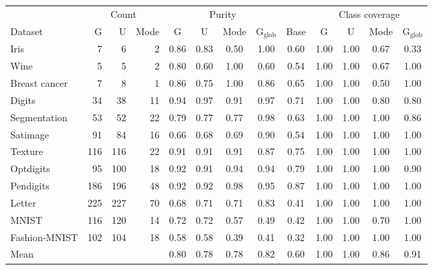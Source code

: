 \begin{tabular}{@{}lrrrccccccccc@{}}
\toprule
 & \multicolumn{3}{c}{Count} & \multicolumn{4}{c}{Purity} & & \multicolumn{4}{c}{Class coverage} \\
\cmidrule(lr){2-4}\cmidrule(lr){5-8}\cmidrule(lr){10-13}
Dataset & G & U & Mode & G & U & Mode & G$_{\mathrm{glob}}$ & Base & G & U & Mode & G$_{\mathrm{glob}}$ \\
\midrule
Iris & 7 & 6 & 2 & 0.86 & 0.83 & 0.50 & 1.00 & 0.60 & 1.00 & 1.00 & 0.67 & 0.33 \\
Wine & 5 & 5 & 2 & 0.80 & 0.60 & 1.00 & 0.60 & 0.54 & 1.00 & 1.00 & 0.67 & 1.00 \\
Breast cancer & 7 & 8 & 1 & 0.86 & 0.75 & 1.00 & 0.86 & 0.65 & 1.00 & 1.00 & 0.50 & 1.00 \\
Digits & 34 & 38 & 11 & 0.94 & 0.97 & 0.91 & 0.97 & 0.71 & 1.00 & 1.00 & 0.80 & 0.80 \\
Segmentation & 53 & 52 & 22 & 0.79 & 0.77 & 0.77 & 0.98 & 0.63 & 1.00 & 1.00 & 1.00 & 0.86 \\
Satimage & 91 & 84 & 16 & 0.66 & 0.68 & 0.69 & 0.90 & 0.54 & 1.00 & 1.00 & 1.00 & 1.00 \\
Texture & 116 & 116 & 22 & 0.91 & 0.91 & 0.91 & 0.87 & 0.75 & 1.00 & 1.00 & 1.00 & 1.00 \\
Optdigits & 95 & 100 & 18 & 0.92 & 0.91 & 0.94 & 0.94 & 0.79 & 1.00 & 1.00 & 1.00 & 0.90 \\
Pendigits & 186 & 196 & 48 & 0.92 & 0.92 & 0.98 & 0.95 & 0.87 & 1.00 & 1.00 & 1.00 & 1.00 \\
Letter & 225 & 227 & 70 & 0.68 & 0.71 & 0.71 & 0.83 & 0.41 & 1.00 & 1.00 & 1.00 & 1.00 \\
MNIST & 116 & 120 & 14 & 0.72 & 0.72 & 0.57 & 0.49 & 0.42 & 1.00 & 1.00 & 0.70 & 1.00 \\
Fashion-MNIST & 102 & 104 & 18 & 0.58 & 0.58 & 0.39 & 0.41 & 0.32 & 1.00 & 1.00 & 1.00 & 1.00 \\
\midrule
Mean & & & & 0.80 & 0.78 & 0.78 & 0.82 & 0.60 & 1.00 & 1.00 & 0.86 & 0.91 \\
\bottomrule
\end{tabular}
